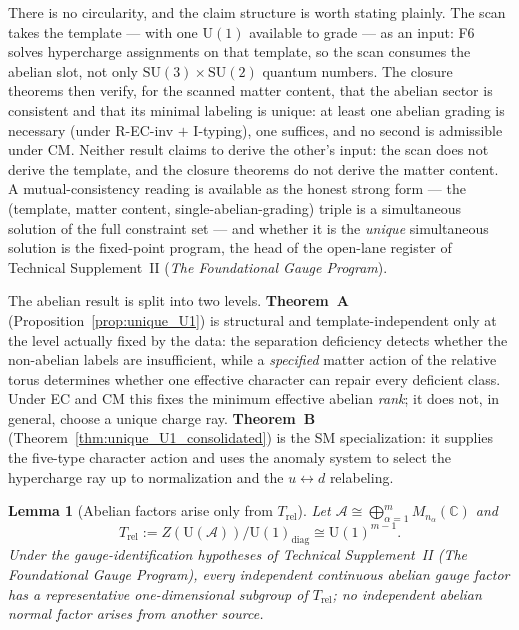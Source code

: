 \documentclass[11pt]{article}
\newtheorem{lemma}[theorem]{Lemma}
\theoremstyle{definition}
\newcommand{\SU}{\mathrm{SU}}
\newcommand{\U}{\mathrm{U}}
\newcommand{\TSII}{Technical Supplement~II (\emph{The Foundational Gauge Program})}
\begin{document}
There is no circularity, and the claim structure is worth stating
plainly.  The scan takes the template --- with one $\U(1)$ available
to grade --- as an input: F6 solves hypercharge assignments on that
template, so the scan consumes the abelian slot, not only
$\SU(3)\times\SU(2)$ quantum numbers.  The closure theorems then
verify, for the scanned matter content, that the abelian sector is
consistent and that its minimal labeling is unique: at least one
abelian grading is necessary (under R-EC-inv $+$ I-typing), one
suffices, and no second is admissible under CM.  Neither result
claims to derive the other's input: the scan does not derive the
template, and the closure theorems do not derive the matter content.
A mutual-consistency reading is available as the honest strong form
--- the (template, matter content, single-abelian-grading) triple is a
simultaneous solution of the full constraint set --- and whether it is
the \emph{unique} simultaneous solution is the fixed-point program,
the head of the open-lane register of \TSII.

\smallskip\noindent The abelian result is split into two levels.
\textbf{Theorem~A} (Proposition~\ref{prop:unique_U1}) is
structural and template-independent only at the level actually fixed
by the data: the separation deficiency detects whether the
non-abelian labels are insufficient, while a \emph{specified} matter
action of the relative torus determines whether one effective
character can repair every deficient class.  Under EC and CM this
fixes the minimum effective abelian \emph{rank}; it does not, in
general, choose a unique charge ray.  \textbf{Theorem~B}
(Theorem~\ref{thm:unique_U1_consolidated}) is the SM specialization:
it supplies the five-type character action and uses the anomaly
system to select the hypercharge ray up to normalization and the
$u\leftrightarrow d$ relabeling.

\begin{lemma}[Abelian factors arise only from $T_{\mathrm{rel}}$]
\label{lem:abelian_source}
Let
$\mathcal A\cong\bigoplus_{\alpha=1}^{m}M_{n_\alpha}(\mathbb C)$ and
\[
 T_{\mathrm{rel}}:=Z(\mathrm U(\mathcal A))/\mathrm U(1)_{\mathrm{diag}}
 \cong \mathrm U(1)^{m-1}.
\]
Under the gauge-identification hypotheses of \TSII{}, every
independent continuous abelian gauge factor has a representative
one-dimensional subgroup of $T_{\mathrm{rel}}$; no independent
abelian normal factor arises from another source.
\end{lemma}
\end{document}
